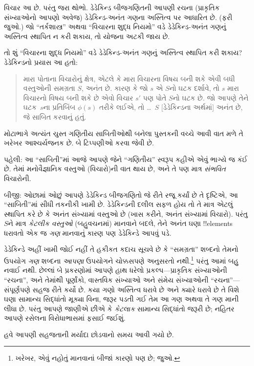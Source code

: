 \documentclass[../../../include/open-logic-section]{subfiles}
\begin{document}
વિચાર આ છે. પરંતુ જરા થોભો. ડેડેકિન્ડ બીજગણિતની આપણી રચના
(પ્રાકૃતિક સંખ્યાઓનો આપણો અવેજ) ડેડેકિન્ડ-અનંત ગણના અસ્તિત્વ પર
આધારિત છે. (ફરી 
જુઓ.) જો ``તર્કશાસ્ત્ર'' અથવા ``વિચારના શુદ્ધ નિયમો'' વડે
ડેડેકિન્ડ-અનંત ગણનું અસ્તિત્વ સ્થાપિત ન કરી શકાય, તો યોજના અટકી જાય છે.

તો શું ``વિચારના શુદ્ધ નિયમો'' વડે ડેડેકિન્ડ-અનંત ગણનું અસ્તિત્વ
સ્થાપિત કરી શકાય? ડેડેકિન્ડનો પ્રયાસ આ હતો:
\begin{quote}
  મારા પોતાના વિચારોનું ક્ષેત્ર, એટલે કે મારા વિચારના વિષય બની શકે
  એવી બધી વસ્તુઓની સમગ્રતા $S$, અનંત છે. કારણ કે જો $s$ એ $S$નો
  ઘટક દર્શાવે, તો $s$ મારા વિચારનો વિષય બની શકે છે એવો વિચાર $s'$ પણ
  પોતે $S$નો ઘટક છે. જો આપણે તેને ઘટક~$s$ના પ્રતિબિંબ $\phi(s)$ તરીકે
  લઈએ, તો \dots~$S$ [ડેડેકિન્ડના અર્થમાં] અનંત છે, જે સાબિત કરવાનું હતું.
	\citep[\S66]{Dedekind1888}
\end{quote}
મોટાભાગે અત્યંત ચુસ્ત ગણિતીય સાબિતીઓથી બનેલા પુસ્તકની વચ્ચે આવી વાત
મળે તે ખરેખર આશ્ચર્યજનક છે. બે ટિપ્પણીઓ કરવા જેવી છે.

પહેલી: આ ``સાબિતી''માં આજે આપણે જેને ``ગણિતીય'' સ્વરૂપ કહીએ એવું
ભાગ્યે જ કંઈ છે. તેમાં મનોવૈજ્ઞાનિક વસ્તુઓ (વિચારો)ની વાત થાય છે, અને
તે પણ માત્ર \emph{સંભવિત} વિચારોની.

બીજી: ઓછામાં ઓછું આપણે ડેડેકિન્ડ બીજગણિતો જે રીતે રજૂ કર્યાં છે તે
દૃષ્ટિએ, આ ``સાબિતી''માં સીધી તકનીકી ખામી છે. ડેડેકિન્ડની દલીલ સફળ
હોય તો તે માત્ર એટલું સ્થાપિત કરે છે કે અનંત સંખ્યામાં વસ્તુઓ છે
(ખાસ કરીને, અનંત સંખ્યામાં વિચારો). પરંતુ $S$ને માત્ર \emph{કેટલીક વસ્તુઓ} (બહુવચનમાં) માનવાને બદલે, તેને અનંત ઘણા !!{element}s ધરાવતો એક જ
\emph{ગણ} માનવાનું કારણ પણ ડેડેકિન્ડે આપવું પડે.

ડેડેકિન્ડે અહીં ખામી જોઈ નહીં તે હકીકત કદાચ સૂચવે છે કે
``સમગ્રતા'' શબ્દનો તેમનો ઉપયોગ \emph{ગણ} શબ્દના \emph{આપણા} ઉપયોગને
ચોક્કસપણે અનુસરતો નથી.\footnote{ખરેખર, એવું નહોતું માનવાનાં બીજાં
કારણો પણ છે; \citet[p.~23]{Potter2004} જુઓ.} પરંતુ આમાં બહુ નવાઈ નથી.
છેલ્લાં બે પ્રકરણોમાં આપણે હાથ ધરેલો પ્રકલ્પ---પ્રાકૃતિક સંખ્યાઓની
``રચના'', અને તેમાંથી પૂર્ણાંકો, વાસ્તવિક સંખ્યાઓ અને સંમેય સંખ્યાઓની
``રચના''---સંપૂર્ણપણે સહજ રીતે કર્યો છે. કયા ગણો અસ્તિત્વ ધરાવે છે અને
ક્યારે ધરાવે છે તે વિશે ઘણા સામાન્ય સિદ્ધાંતો મૂક્યા વિના, જરૂર પડતી
ગઈ તેમ આ ગણ અથવા તે ગણ માની લીધા છે. પરંતુ આપણે જાણીએ છીએ કે
\emph{કેટલાક} સામાન્ય સિદ્ધાંતો જરૂરી છે; નહિતર આપણે રસેલના
વિરોધાભાસમાં ફસાઈ જઈશું.

 હવે આપણી સહજતાની મર્યાદા છોડવાનો સમય આવી ગયો છે.
\end{document}
